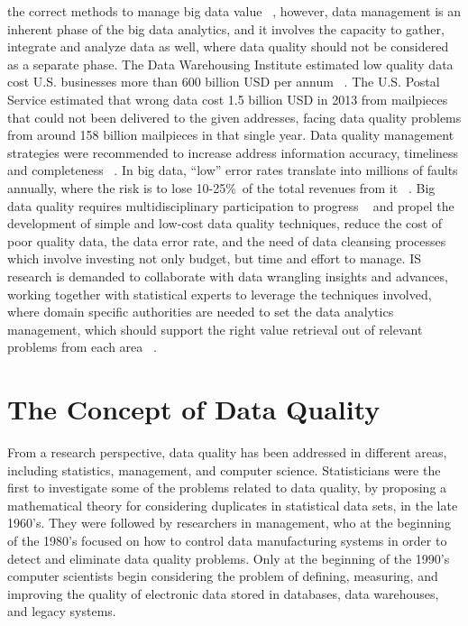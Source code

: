the correct methods to manage big data value ~\cite{Lavalle2011}, however, data management is an
inherent phase of the big data analytics, and it involves the capacity to gather, integrate
and analyze data as well, where data quality should not be considered as a separate
phase.
The Data Warehousing Institute estimated low quality data cost U.S. businesses
more than 600 billion USD per annum ~\cite{Eckerson2002}. The U.S. Postal Service estimated that
wrong data cost 1.5 billion USD in 2013 from mailpieces that could not been delivered
to the given addresses, facing data quality problems from around 158 billion mailpieces
in that single year. Data quality management strategies were recommended to increase
address information accuracy, timeliness and completeness ~\cite{USAPostService2014}. In big data, “low”
error rates translate into millions of faults annually, where the risk is to lose 10-25\%\ of
the total revenues from it ~\cite{Eckerson2002}.
Big data quality requires multidisciplinary participation to progress ~\cite{Hazen2014} and propel the development of simple and low-cost data quality techniques, reduce the cost of
poor quality data, the data error rate, and the need of data cleansing processes which
involve investing not only budget, but time and effort to manage. IS research is demanded to collaborate with data wrangling insights and advances, working together
with statistical experts to leverage the techniques involved, where domain specific authorities are needed to set the data analytics management, which should support the
right value retrieval out of relevant problems from each area ~\cite{Hazen2014}.

\section{The Concept of Data Quality}

From a research perspective, data quality has been addressed in different
areas, including statistics, management, and computer science. Statisticians were the first to investigate some of the problems related to data quality, by
proposing a mathematical theory for considering duplicates in statistical data sets, in the late 1960's. They were followed by researchers in management, who
at the beginning of the 1980's focused on how to control data manufacturing systems in order to detect and eliminate data quality problems. Only at the
beginning of the 1990's computer scientists begin considering the problem of defining, measuring, and improving the quality of electronic data stored in
databases, data warehouses, and legacy systems.

